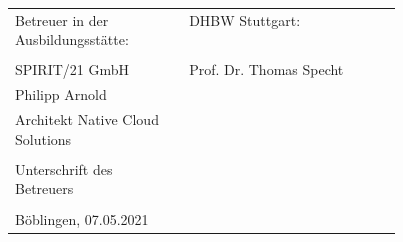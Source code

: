 \begin{spacing}{1}
\begin{tabular}{p{0.45\linewidth}l}
Betreuer in der Ausbildungsstätte: & DHBW Stuttgart: \\
\hspace{0.4\linewidth} & \\
 SPIRIT/21 GmbH  &  Prof. Dr. Thomas Specht  \\
 Philipp Arnold    \\
 Architekt Native Cloud Solutions  \\
\\
Unterschrift des Betreuers \\
\noalign{\vspace{1.2cm}}    \\
Böblingen, 07.05.2021 \\
\end{tabular}


\end{spacing}


 

